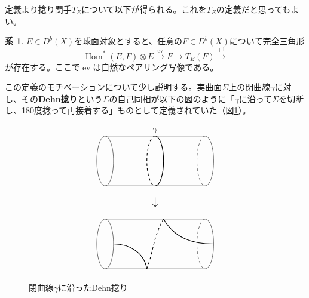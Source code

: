 \documentclass[uplatex,11pt,a4paper,dvipdfmx]{jsarticle}
\numberwithin{equation}{section}
\numberwithin{figure}{section}
\theoremstyle{definition}
\newtheorem{corollary}[theorem]{系}
\DeclareMathOperator{\Hom}{\mathrm{Hom}}
\DeclareMathOperator{\ev}{\mathrm{ev}}
\begin{document}
定義より捻り関手$T_E$について以下が得られる。これを$T_E$の定義だと思ってもよい。
\begin{corollary}
    $E \in D^b(X)$を球面対象とすると、任意の$F \in D^b(X)$について完全三角形
    \begin{equation}\label{eq:twist}
        \Hom^*(E, F) \otimes E \xrightarrow{\ev} F \to T_E (F) \xrightarrow{+1}
    \end{equation}
    が存在する。ここで$\ev$は自然なペアリング写像である。
\end{corollary}
この定義のモチベーションについて少し説明する。実曲面$\Sigma$上の閉曲線$\gamma$に対し、その\textbf{Dehn捻り}という$\Sigma$の自己同相が以下の図のように「$\gamma$に沿って$\Sigma$を切断し、180度捻って再接着する」ものとして定義されていた（図\ref{fig:dehn-twist}）。


\begin{figure}[h]
    \centering
    \begin{displaymath}
        \begin{tikzpicture}[scale=0.7]
            \draw (0,0+5)--(6,0+5);
            \draw (0,3+5)--(6,3+5);

            \draw[thick] (0.5, 1.5+5)--(6.5, 1.5+5);

            \draw (0, 1.5+5) circle[x radius=0.5, y radius=1.5];

            \draw(6, 0+5)arc(-90:90:0.5 and 1.5);
            \draw[dashed](6, 3+5)arc(90:270:0.5 and 1.5);

            \draw[thick](3, 0+5)arc(-90:90:0.5 and 1.5);
            \draw[thick, dashed](3, 3+5)arc(90:270:0.5 and 1.5);


            \draw(3, 3+5) node[above]{$\gamma$};

            \draw(3, -0.5+5) node[below]{\Large$\downarrow$};


            \draw (0,0)--(6,0);
            \draw (0,3)--(6,3);

            \draw (0, 1.5) circle[x radius=0.5, y radius=1.5];

            \draw(6, 0)arc(-90:90:0.5 and 1.5);
            \draw[dashed](6, 3)arc(90:270:0.5 and 1.5);

            \draw[thick](0.5, 1.5) to[out=0,in=100](2.5, 0);
            \draw[thick, dashed](2.5, 0) to[out=70,in=-120](3.5, 3);
            \draw[thick](3.5, 3) to[out=-60,in=180](6.5, 1.5);
        \end{tikzpicture}
    \end{displaymath}
    \caption{閉曲線$\gamma$に沿ったDehn捻り}
    \label{fig:dehn-twist}
\end{figure}
\end{document}
